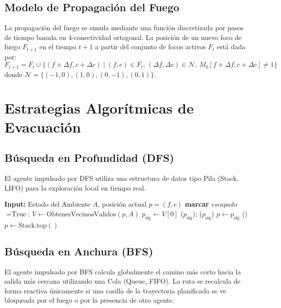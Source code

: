 \documentclass[11pt, a4paper]{article}
\begin{document}
\subsection{Modelo de Propagación del Fuego}
La propagación del fuego se simula mediante una función discretizada por pasos de tiempo basada en $4$-conectividad ortogonal. La posición de un nuevo foco de fuego $F_{t+1}$ en el tiempo $t+1$ a partir del conjunto de focos activos $F_t$ está dada por:
\begin{equation}
F_{t+1} = F_t \cup \{ (f + \Delta f, c + \Delta c) \mid (f,c) \in F_t, \, (\Delta f, \Delta c) \in \mathcal{N}, \, M_0[f+\Delta f, c+\Delta c] \neq 1 \}
\end{equation}
donde $\mathcal{N} = \{(-1,0), (1,0), (0,-1), (0,1)\}$.

\section{Estrategias Algorítmicas de Evacuación}

\subsection{Búsqueda en Profundidad (DFS)}
El agente impulsado por DFS utiliza una estructura de datos tipo Pila (Stack, LIFO) para la exploración local en tiempo real.

\begin{algorithm}[H]
\caption{Paso de Ejecución Agente DFS}
\begin{algorithmic}[1]
\State \textbf{Input:} Estado del Ambiente $A$, posición actual $p = (f, c)$
    \State \textbf{marcar} \textit{escapado} $= \text{True}$; \Return
\EndIf
\State $V \gets \text{ObtenerVecinosValidos}(p, A)$ 
    \State $p_{\text{sig}} \gets V[0]$
    \State {}($p_{\text{sig}}$); ($p_{\text{sig}}$)
    \State $p \gets p_{\text{sig}}$
\Else
        \State {}()
        \State $p \gets \text{Stack.top}()$ 
    \EndIf
\EndIf
\end{algorithmic}
\end{algorithm}

\subsection{Búsqueda en Anchura (BFS)}
El agente impulsado por BFS calcula globalmente el camino más corto hacia la salida más cercana utilizando una Cola (Queue, FIFO). La ruta se recalcula de forma reactiva únicamente si una casilla de la trayectoria planificada se ve bloqueada por el fuego o por la presencia de otro agente.
\end{document}
